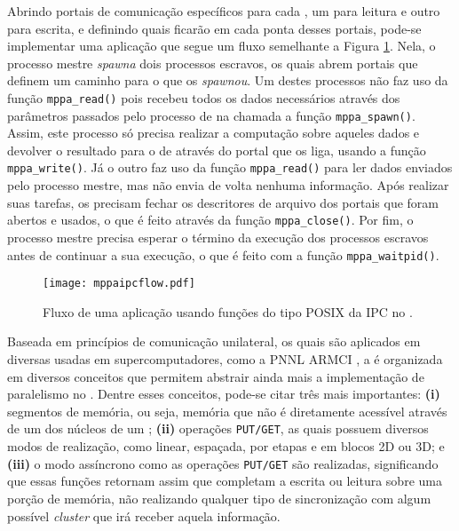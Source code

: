 Abrindo portais de comunicação específicos para cada \cluster, um para leitura e outro para escrita, e definindo quais \clusters ficarão em cada ponta desses portais, pode-se implementar uma aplicação que segue um fluxo semelhante a Figura \ref{fig:mppaipcflow}. Nela, o processo mestre \textit{spawna} dois processos escravos, os quais abrem portais que definem um caminho para o \cluster que os \textit{spawnou}. Um destes processos não faz uso da função \texttt{mppa\_read()} pois recebeu todos os dados necessários através dos parâmetros passados pelo processo de \IO na chamada a função \texttt{mppa\_spawn()}. Assim, este processo só precisa realizar a computação sobre aqueles dados e devolver o resultado para o \cluster de \IO através do portal que os liga, usando a função \texttt{mppa\_write()}. Já o outro \cluster faz uso da função \texttt{mppa\_read()} para ler dados enviados pelo processo mestre, mas não envia de volta nenhuma informação. Após realizar suas tarefas, os \CCs precisam fechar os descritores de arquivo dos portais que foram abertos e usados, o que é feito através da função \texttt{mppa\_close()}. Por fim, o processo mestre precisa esperar o término da execução dos processos escravos antes de continuar a sua execução, o que é feito com a função \texttt{mppa\_waitpid()}.

\begin{figure}[tb]
  \centering
  \caption{Fluxo de uma aplicação usando funções do tipo POSIX da IPC no \mppa.}
  \label{fig:mppaipcflow}
  \texttt{[image: mppaipcflow.pdf]}
\end{figure}

Baseada em princípios de comunicação unilateral, os quais são aplicados em diversas \APIs usadas em supercomputadores, como a \API PNNL ARMCI \cite{armciapproach}, a \ASYNC é organizada em diversos conceitos que permitem abstrair ainda mais a implementação de paralelismo no \mppa. Dentre esses conceitos, pode-se citar três mais importantes: \textbf{(i)} segmentos de memória, ou seja, memória que não é diretamente acessível através de um dos núcleos de um \cluster; \textbf{(ii)} operações \texttt{PUT/GET}, as quais possuem diversos modos de realização, como linear, espaçada, por etapas e em blocos 2D ou 3D; e \textbf{(iii)} o modo assíncrono como as operações \texttt{PUT/GET} são realizadas, significando que essas funções retornam assim que completam a escrita ou leitura sobre uma porção de memória, não realizando qualquer tipo de sincronização com algum possível \textit{cluster} que irá receber aquela informação.
 
